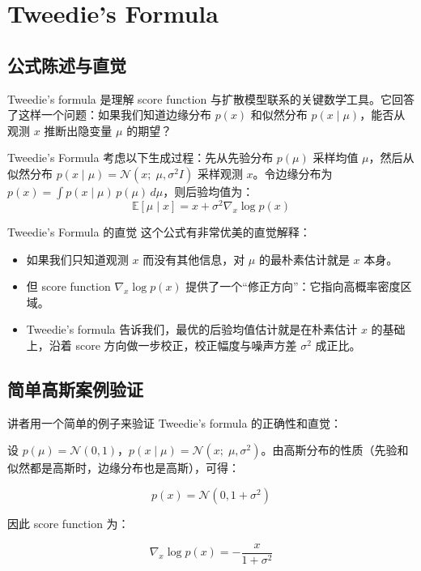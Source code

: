 \section{Tweedie's Formula}

\subsection{公式陈述与直觉}

Tweedie's formula 是理解 score function 与扩散模型联系的关键数学工具。它回答了这样一个问题：如果我们知道边缘分布 $p(x)$ 和似然分布 $p(x \mid \mu)$，能否从观测 $x$ 推断出隐变量 $\mu$ 的期望？

\begin{importantbox}{Tweedie's Formula}
考虑以下生成过程：先从先验分布 $p(\mu)$ 采样均值 $\mu$，然后从似然分布 $p(x \mid \mu) = \mathcal{N}(x;\; \mu, \sigma^2 I)$ 采样观测 $x$。令边缘分布为 $p(x) = \int p(x \mid \mu)\, p(\mu)\, d\mu$，则后验均值为：
$$\mathbb{E}[\mu \mid x] = x + \sigma^2 \nabla_x \log p(x)$$
\end{importantbox}

\begin{knowledgebox}{Tweedie's Formula 的直觉}
这个公式有非常优美的直觉解释：
\begin{itemize}
    \item 如果我们只知道观测 $x$ 而没有其他信息，对 $\mu$ 的最朴素估计就是 $x$ 本身。
    \item 但 score function $\nabla_x \log p(x)$ 提供了一个``修正方向''：它指向高概率密度区域。
    \item Tweedie's formula 告诉我们，最优的后验均值估计就是在朴素估计 $x$ 的基础上，沿着 score 方向做一步校正，校正幅度与噪声方差 $\sigma^2$ 成正比。
\end{itemize}
\end{knowledgebox}

\subsection{简单高斯案例验证}

讲者用一个简单的例子来验证 Tweedie's formula 的正确性和直觉：

设 $p(\mu) = \mathcal{N}(0, 1)$，$p(x \mid \mu) = \mathcal{N}(x;\; \mu, \sigma^2)$。由高斯分布的性质（先验和似然都是高斯时，边缘分布也是高斯），可得：

$$p(x) = \mathcal{N}(0, 1 + \sigma^2)$$

因此 score function 为：

$$\nabla_x \log p(x) = -\frac{x}{1 + \sigma^2}$$

